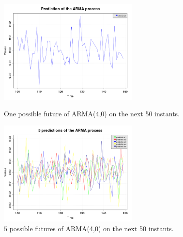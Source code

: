 \begin{figure}[H]
  \begin{minipage}{9cm}
    \begin{center}
      \includegraphics[width=7cm]{arma1D_prediction.png}
      \caption{One possible future of ARMA(4,0) on the next 50 instants.}
      \label{arma_Prediction}
    \end{center}
  \end{minipage}
  \hfill
  \begin{minipage}{9cm}
    \begin{center}
      \includegraphics[width=7cm]{arma1D_predictions.png}
      \caption{$5$ possible futures of ARMA(4,0) on the next 50 instants.}
      \label{arma_Predictions}
    \end{center}
  \end{minipage}
\end{figure}